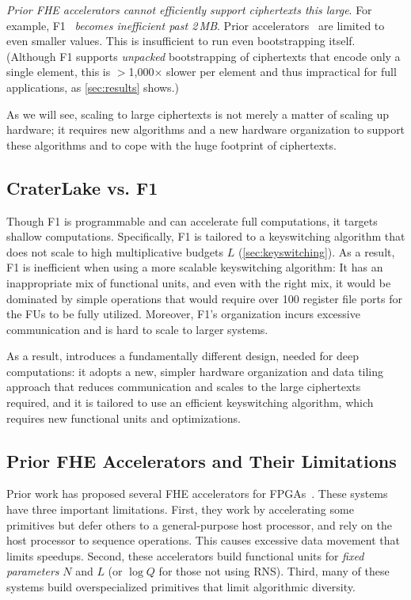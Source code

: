 \figBootstrappingFrequency

\emph{Prior FHE accelerators cannot efficiently support ciphertexts this large}.
For example, F1~\cite{feldmann:micro21:f1} \emph{becomes inefficient past
2\,MB}. Prior accelerators~\cite{riazi:asplos20:heax} are limited to even
smaller values. This is insufficient to run even bootstrapping itself.
(Although F1 supports \emph{unpacked} bootstrapping of ciphertexts that encode
only a single element, this is $>$1,000$\times$ slower per element and thus
impractical for full applications, as \autoref{sec:results} shows.)

As we will see, scaling to large ciphertexts is not merely a matter of scaling
up hardware; it requires new algorithms and a new hardware organization to
support these algorithms and to cope with the huge footprint of ciphertexts.

\subsection{CraterLake vs. F1}

Though F1 is programmable and can accelerate full computations, it targets
shallow computations. Specifically, F1 is tailored to a keyswitching algorithm
that does not scale to high multiplicative budgets $L$
(\autoref{sec:keyswitching}). As a result, F1 is inefficient when using a more
scalable keyswitching algorithm: It has an inappropriate mix of functional
units, and even with the right mix, it would be dominated by simple operations
that would require over 100 register file ports for the FUs to be fully
utilized.
Moreover, F1's organization incurs excessive communication and is hard to scale
to larger systems.

As a result, \name introduces a fundamentally different design, needed for deep
computations: it adopts a new, simpler hardware organization and data tiling
approach that reduces communication and scales to the large ciphertexts
required, and it is tailored to use an efficient keyswitching algorithm, which
requires new functional units and optimizations.

\subsection{Prior FHE Accelerators and Their Limitations}\label{sec:drawbacks}


Prior work has proposed several FHE accelerators for
FPGAs~\cite{cousins:hpec14:fpga-he,cousins:tetc17:fpga-he,doroz:tc15:accelerating-fhe,roy:hpca19:fpga-he,migliore:tecs17:he-karatsuba,riazi:asplos20:heax,turan:tc20:heaws,mert:tvlsi20:bfv-accel}.
These systems have three important limitations. First, they work by
accelerating some primitives but defer others to a general-purpose host
processor, and rely on the host processor to sequence operations. This causes
excessive data movement that limits speedups. Second, these accelerators build
functional units for \emph{fixed parameters} $N$ and $L$ (or $\log Q$ for those
not using RNS). Third, many of these systems build overspecialized primitives
that limit algorithmic diversity.

